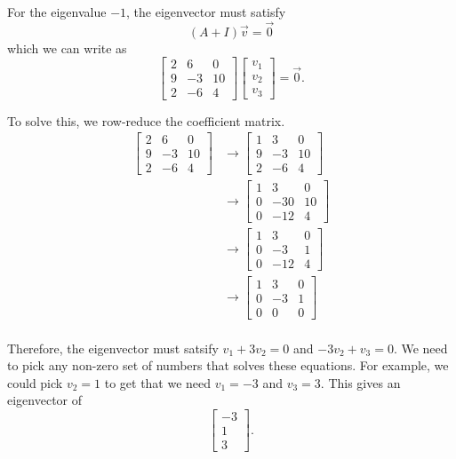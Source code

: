 \documentclass{ximera}
\begin{document}
\begin{exampleSol}
For the eigenvalue $-1$, the eigenvector must satisfy
\[ 
    (A + I)\vec{v} = \vec{0} 
\] 
which we can write as
\[ 
    \begin{bmatrix} 
        2 & 6 & 0 \\ 
        9 & -3 & 10 \\ 
        2 & -6 & 4 
    \end{bmatrix} 
    \begin{bmatrix} 
        v_1 \\ 
        v_2 \\ 
        v_3 
    \end{bmatrix} = \vec{0}. 
\]

To solve this, we row-reduce the coefficient matrix.
\[ 
    \begin{split}
        \begin{bmatrix} 
            2 & 6 & 0 \\ 
            9 & -3 & 10 \\ 
            2 & -6 & 4 
        \end{bmatrix} 
        &\rightarrow 
        \begin{bmatrix} 
            1 & 3 & 0 \\ 
            9 & -3 & 10 \\ 
            2 & -6 & 4 
        \end{bmatrix} \\
        &\rightarrow  
        \begin{bmatrix} 
            1 & 3 & 0 \\ 
            0 & -30 & 10 \\ 
            0 & -12 & 4 
        \end{bmatrix} \\
        &\rightarrow  
        \begin{bmatrix} 
            1 & 3 & 0 \\ 
            0 & -3 & 1 \\ 
            0 & -12 & 4 
        \end{bmatrix} \\
        &\rightarrow  
        \begin{bmatrix} 
            1 & 3 & 0 \\ 
            0 & -3 & 1 \\ 
            0 & 0 & 0 
        \end{bmatrix} \\
    \end{split}
\]

Therefore, the eigenvector must satsify $v_1 + 3v_2 = 0$ and $-3v_2 + v_3 = 0$. We need to pick any non-zero set of numbers that solves these equations. For example, we could pick $v_2 = 1$ to get that we need $v_1 = -3$ and $v_3 = 3$. This gives an eigenvector of 
\[ 
    \begin{bmatrix} 
        -3 \\ 
        1 \\ 
        3 
    \end{bmatrix}. 
\]


\end{exampleSol}
\end{document}
